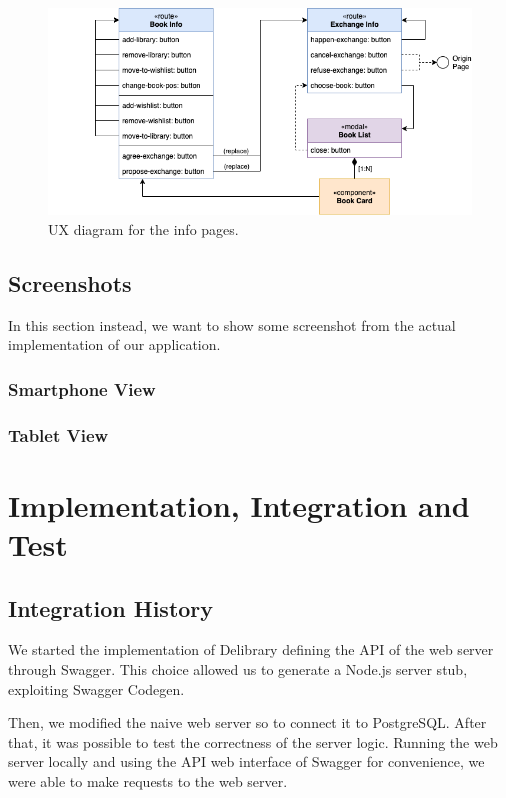 \begin{figure}[H]
      \includegraphics{ux-diagram/ux-info.png}
      \caption{UX diagram for the info pages.}
      \label{fig:ux-info}
\end{figure}

\clearpage
\section{Screenshots}
In this section instead, we want to show some screenshot from the actual implementation of our application.

\subsection{Smartphone View}

\subsection{Tablet View}



\chapter{Implementation, Integration and Test}

\section{Integration History}
We started the implementation of Delibrary defining the API of the web server through Swagger.
This choice allowed us to generate a Node.js server stub, exploiting Swagger Codegen.

Then, we modified the naive web server so to connect it to PostgreSQL.
After that, it was possible to test the correctness of the server logic.
Running the web server locally and using the API web interface of Swagger for convenience, we were able to make requests to the web server.

